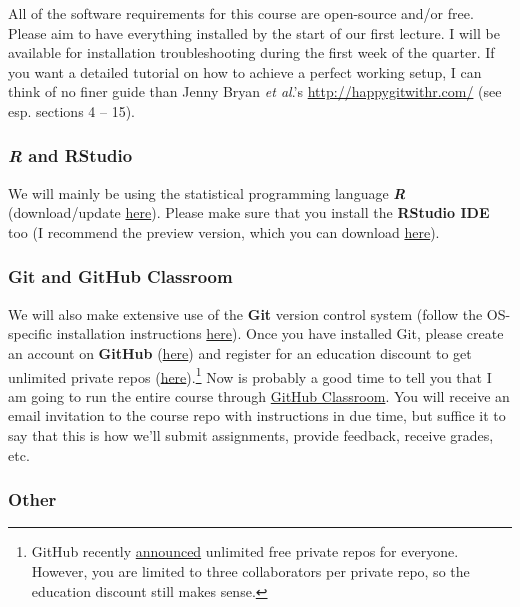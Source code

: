 \documentclass[12]{article}
\begin{document}
All of the software requirements for this course are open-source and/or free. Please aim to have everything installed by the start of our first lecture. I will be available for installation troubleshooting during the first week of the quarter. If you want a detailed tutorial on how to achieve a perfect working setup, I can think of no finer guide than Jenny Bryan \textit{et al}.'s \url{http://happygitwithr.com/} (see esp. sections 4 -- 15).

\vspace{-0.25cm}
\subsubsection*{\textit{R} and RStudio}

We will mainly be using the statistical programming language \textbf{\textit{R}} (download/update \href{https://www.r-project.org/}{here}). Please make sure that you install the \textbf{RStudio IDE} too (I recommend the preview version, which you can download \href{https://www.rstudio.com/products/rstudio/download/preview/}{here}).

\vspace{-0.25cm}
\subsubsection*{Git and GitHub Classroom}

We will also make extensive use of the \textbf{Git} version control system (follow the OS-specific installation instructions \href{http://happygitwithr.com/install-git.html}{here}). Once you have installed Git, please create an account on \textbf{GitHub} (\href{https://github.com/join}{here}) and register for an education discount to get unlimited private repos (\href{https://education.github.com/discount_requests/new}{here}).\footnote{GitHub recently \href{https://blog.github.com/changelog/2019-01-08-pricing-changes/}{announced} unlimited free private repos for everyone. However, you are limited to three collaborators per private repo, so the education discount still makes sense.} Now is probably a good time to tell you that I am going to run the entire course through \href{https://classroom.github.com/}{GitHub Classroom}. You will receive an email invitation to the course repo with instructions in due time, but suffice it to say that this is how we'll submit assignments, provide feedback, receive grades, etc.

\vspace{-0.25cm}
\subsubsection*{Other}
\end{document}
